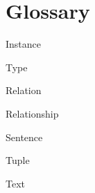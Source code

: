 \section{Glossary}

\begin{clist}
\item Instance
\item Type
\item Relation
\item Relationship 
\item Sentence
\item Tuple
\item Text
\end{clist}
